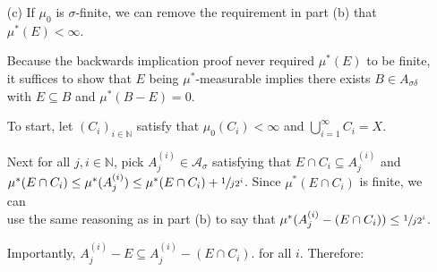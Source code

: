 \documentclass{book}
\newcommand{\exTwoP}{%
   \color{RedViolet}%
   \fontsize{13}{15}\selectfont%
}
\newenvironment{myIndent}{%
   \begin{adjustwidth}{2.5em}{0em}%
}{%
   \end{adjustwidth}%
}
\newcommand{\comp}{\mathsf{C}}
\newcommand{\retTwo}{\hfill\bigbreak}
\begin{document}
\begin{enumerate}
\begin{myIndent}
      To prove the reverse implication, suppose there exists a $\mu^*$-separable set $B$\\ satisfying that $E \subseteq B$ and $\mu^*(B - E) = 0$ (any set in $\mathcal{A}_{\sigma\delta}$ will be $\mu^*$-separable because $\mathcal{A}_{\sigma\delta} \subseteq \mathcal{M}(\mathcal{A})$). Then given any set $F$, we have that:

      {\centering 
      \begin{tabular}{l}
         $\mu^*(F - E) = \mu^*(F \cap E^\comp \cap B) + \mu^*(F \cap E^\comp \cap B^\comp)$\\ [2pt]
         $\phantom{\mu^*(F - E)} = \mu^*(F \cap (B - E)) + \mu^*(F - B) = 0 + \mu^*(F - B)$
      \end{tabular} \retTwo\par}

      Also, since $F \cap E \subseteq F \cap B$, we know that $\mu^*(F \cap E) \leq \mu^*(F \cap B)$.\retTwo

      So, $\mu^*(F \cap E) + \mu^*(F - E) \leq \mu^*(F \cap B) + \mu^*(F - B)  = \mu^*(F)$. Hence, $E$ is $\mu^*$-measurable.\retTwo      
   \end{myIndent}

   \item[(c)] If $\mu_0$ is $\sigma$-finite, we can remove the requirement in part (b) that $\mu^*(E) < \infty$.
   
   \begin{myIndent}\exTwoP
      Because the backwards implication proof never required $\mu^*(E)$ to be finite, it suffices to show that $E$ being $\mu^*$-measurable implies there exists $B \in A_{\sigma\delta}$ with $E \subseteq B$ and $\mu^*(B - E) = 0$.\retTwo

      To start, let $(C_i)_{i \in \mathbb{N}}$ satisfy that $\mu_0(C_i) < \infty$ and $\bigcup\limits_{i = 1}^\infty C_i = X$.\newpage
      
      Next for all $j, i \in \mathbb{N}$, pick $A_j^{(i)} \in \mathcal{A}_\sigma$ satisfying that $E \cap C_i \subseteq A_j^{(i)}$ and\\ [-2pt] $\mu^*(E \cap C_i) \leq \mu^*(A_j^{(i)}) \leq \mu^*(E \cap C_i) + \sfrac{1}{j2^{i}}$. Since $\mu^*(E \cap C_i)$ is finite, we can\\ use the same reasoning as in part (b) to say that $\mu^*(A_j^{(i)} - (E \cap C_i)) \leq \sfrac{1}{j2^i}$.\retTwo

      Importantly, $A_j^{(i)} - E \subseteq A_j^{(i)} - (E \cap C_i)$. for all $i$. Therefore:
      

\end{myIndent}
\end{enumerate}
\end{document}
